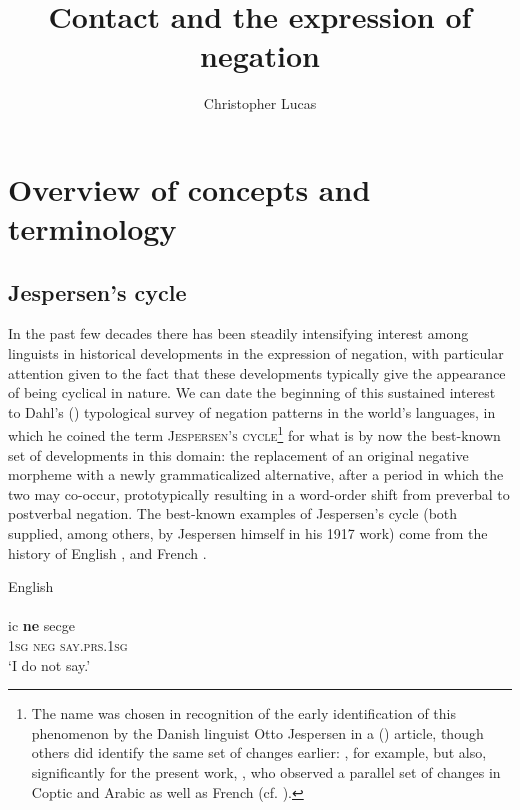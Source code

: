 \documentclass[output=paper]{langsci/langscibook}
\author{Christopher Lucas\affiliation{SOAS University of London}}
\title{Contact and the expression of negation}
\begin{document}
\maketitle 


 


\section{Overview of concepts and terminology}


\subsection{Jespersen’s cycle}


In the past few decades there has been steadily intensifying interest among linguists in historical developments in the expression of negation, with particular attention given to the fact that these developments typically give the appearance of being cyclical in nature. We can date the beginning of this sustained interest to Dahl's (\citeyear{Dahl1979}) typological survey of negation patterns in the world’s languages, in which he coined the term \textsc{Jespersen’s} \textsc{cycle}\footnote{The name was chosen in recognition of the early identification of this phenomenon by the Danish linguist Otto Jespersen in a (\citeyear{Jespersen1917}) article, though others did identify the same set of changes earlier: \citet{Meillet1912}, for example, but also, significantly for the present work, \citet{Gardiner1904}, who observed a parallel set of changes in Coptic and Arabic as well as French (cf. \citealt{Auwera2009}).} for what is by now the best-known set of developments in this domain: the replacement of an original negative morpheme with a newly grammaticalized alternative, after a period in which the two may co-occur, prototypically resulting in a word-order shift from preverbal to postverbal negation. The best-known examples of Jespersen’s cycle (both supplied, among others, by Jespersen himself in his 1917 work) come from the history of English , and French .

\ea\label{ex:key:eng}
{English \citep[9]{Jespersen1917}}\\
\\
\gll ic \textbf{ne} secge\\
     \textsc{1sg}  \textsc{neg} \textsc{\textup{say}}.\textsc{prs.1sg}  \\
\glt ‘I do not say.’
\end{document}
